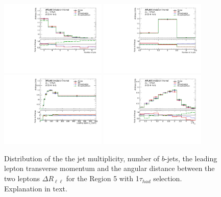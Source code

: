 \begin{figure}[!htb]
\centering
\includegraphics[width=0.45\textwidth]{Plots/ttV/shape/c_Region_4_nJets}
\includegraphics[width=0.45\textwidth]{Plots/ttV/shape/c_Region_4_nBtagJets}\\
\includegraphics[width=0.45\textwidth]{Plots/ttV/shape/c_Region_4_lep_Pt_0} 
\includegraphics[width=0.45\textwidth]{Plots/ttV/shape/c_Region_4_DRll01}\\
  \caption{Distribution of the the jet multiplicity, number of $b$-jets, the leading lepton transverse momentum and the angular distance between the two leptons  $\Delta R _{\ell \ell }$ for the Region 5 with 1$\tau_{had}$ selection. Explanation in text.
   \label{ttV:tauR_kin}}
\end{figure}
% 



